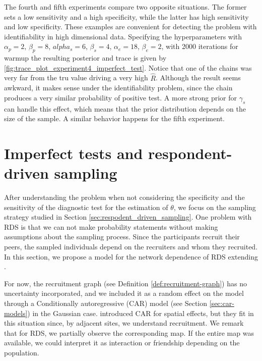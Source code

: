 The fourth and fifth experiments compare two opposite situations. The former
sets a low sensitivity and a high specificity, while the latter has high
sensitivity and low specificity. These examples are convenient for detecting
the problem with identifiability in high dimensional data. Specifying the hyperparameters with $\alpha_p =
2$,  $\beta_p = 8$, $alpha_s = 6$, $\beta_s = 4$, $\alpha_e = 18$, $\beta_e =
2$, with 2000 iterations for warmup the resulting posterior and trace is given
by \autoref{fig:trace_plot_experiment4_imperfect_test}. Notice that one of the
chains was very far from the tru value driving a very high $\hat{R}$. Although
the result seems awkward, it makes sense under the identifiability problem,
since the chain produces a very similar probability of positive test. A more
strong prior for $\gamma_s$ can handle this effect, which means that the prior
distribution depends on the size of the sample. A similar behavior happens
for the fifth experiment. 

\section{Imperfect tests and respondent-driven sampling}

After understanding the problem when not considering the specificity and the
sensitivity of the diagnostic test for the estimation of $\theta$, we focus on
the sampling strategy studied in Section \ref{sec:respodent_driven_sampling}. 
One problem with RDS is that we
can not make probability statements without making assumptions about the
sampling process. Since the participants recruit their peers, the sampled
individuals depend on the recruiters and whom they recruited. In this section,
we propose a model for the network dependence of RDS extending
\textcite{bastos2012binary}. 

For now, the recruitment graph (see Definition  \ref{def:recruitment-graph}) 
has no uncertainty
incorporated, and we included it as a random effect on the model through a
Conditionally autoregressive (CAR) model (see Section \ref{sec:car-models}) in the Gaussian case.
\textcite{besag1974spatial} introduced
CAR for spatial effects, but they fit in this situation since, by
adjacent sites, we understand recruitment. We remark that for RDS, we
partially observe the corresponding map. If the entire map was available, we
could interpret it as interaction or friendship depending on the population. 

